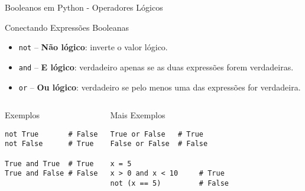 \begin{frame}[fragile]{Booleanos em Python - Operadores Lógicos}

    \begin{block}{Conectando Expressões Booleanas}
        \begin{itemize}
            \item \texttt{not} – \textbf{Não lógico}: inverte o valor lógico.
            \item \texttt{and} – \textbf{E lógico}: verdadeiro apenas se as duas expressões forem verdadeiras.
            \item \texttt{or} – \textbf{Ou lógico}: verdadeiro se pelo menos uma das expressões for verdadeira.
        \end{itemize}
    \end{block}

    \vspace{0.5em}

    \begin{columns}[T]
        \begin{block}{Exemplos}
            \begin{verbatim}
not True       # False
not False      # True

True and True  # True
True and False # False
\end{verbatim}
        \end{block}

        \begin{block}{Mais Exemplos}
            \begin{verbatim}
True or False   # True
False or False  # False

x = 5
x > 0 and x < 10     # True
not (x == 5)         # False
\end{verbatim}
        \end{block}
    \end{columns}

\end{frame}

